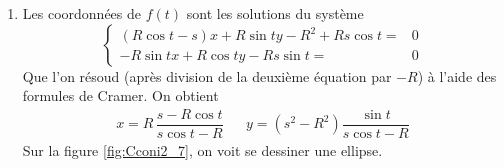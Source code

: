 \begin{enumerate}
\begin{enumerate}
\item Les coordonnées de $f(t)$ sont les solutions du système
\begin{displaymath}
 \left\lbrace 
\begin{aligned}
 (R\cos t -s)x+R\sin t y -R^2+Rs\cos t =& 0\\
 -R\sin t x +R \cos t y -Rs\sin t =&0
\end{aligned}
\right. 
\end{displaymath}
 Que l'on résoud (après division de la deuxième équation par $-R$) à l'aide des formules de Cramer. On obtient
\begin{align*}
 x=R\,\dfrac{s-R\cos t}{s\cos t -R} & & y=(s^2-R^2)\dfrac{\sin t}{s\cos t -R}
\end{align*}
Sur la figure \ref{fig:Cconi2_7}, on voit se dessiner une ellipse.
\end{enumerate}

\end{enumerate}

